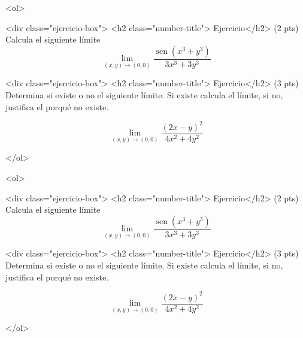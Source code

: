 \documentclass[12pt]{article}
\newcommand{\sen}{\operatorname{sen}}
\begin{document}
\bigskip

            
\bigskip
\bigskip
\bigskip


<ol>

<div class="ejercicio-box"> <h2 class="number-title"> Ejercicio</h2> (2 pts) Calcula el siguiente  límite
$$
\lim_{(x,y)\to (0,0)} \frac{\sen(x^3+y^3)}{3x^3+3y^3}
$$
  
\vspace{1.5cm}  
  
<div class="ejercicio-box"> <h2 class="number-title"> Ejercicio</h2> (3 pts) Determina si existe o no el siguiente límite. Si existe calcula el límite,  si no, justifica el porqué no existe.

$$
\lim_{(x,y) \to (0,0)} \frac{(2x-y)^2}{4x^2+4y^2}
$$



  </ol>


  \vspace{2.5cm}
  
  
\bigskip

            
\bigskip
\bigskip
\bigskip


<ol>

<div class="ejercicio-box"> <h2 class="number-title"> Ejercicio</h2> (2 pts) Calcula el siguiente  límite
$$
\lim_{(x,y)\to (0,0)} \frac{\sen(x^3+y^3)}{3x^3+3y^3}
$$
  
\vspace{1.5cm}  
  
<div class="ejercicio-box"> <h2 class="number-title"> Ejercicio</h2> (3 pts) Determina si existe o no el siguiente límite. Si existe calcula el límite,  si no, justifica el porqué no existe.

$$
\lim_{(x,y) \to (0,0)} \frac{(2x-y)^2}{4x^2+4y^2}
$$



  </ol>

  
\end{document}
